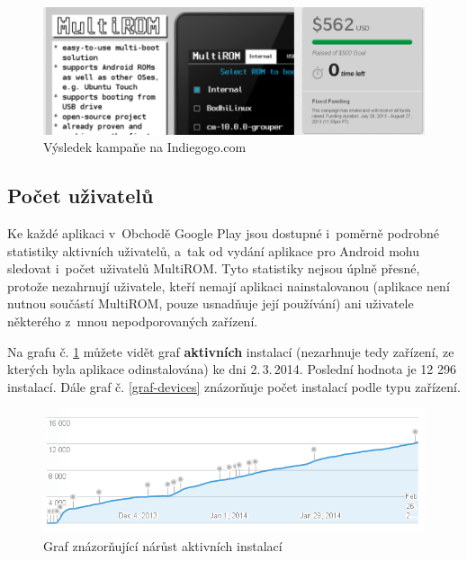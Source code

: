\documentclass[12pt, a4paper, oneside]{article}
\newcommand{\B}{\textbf} %
\begin{document}
\begin{figure}[H]
\begin{center}
 \includegraphics[width=\textwidth]{img/indiegogo.png}
\caption{Výsledek kampaňe na Indiegogo.com}
\end{center}
\end{figure}

\subsection{Počet uživatelů}
Ke každé aplikaci v~Obchodě Google Play jsou dostupné i~poměrně podrobné statistiky aktivních uživatelů, a~tak od vydání aplikace pro Android mohu sledovat i~počet uživatelů MultiROM. Tyto statistiky nejsou úplně přesné, protože nezahrnují uživatele, kteří nemají aplikaci nainstalovanou (aplikace není nutnou součástí MultiROM, pouze usnadňuje její používání) ani uživatele některého z~mnou nepodporovaných zařízení.

Na grafu č. \ref{graf-uzivatele} můžete vidět graf \B{aktivních} instalací (nezarhnuje tedy zařízení, ze kterých byla aplikace odinstalována) ke dni 2.\,3.\,2014. Poslední hodnota je 12 296 instalací. Dále graf č. \ref{graf-devices} znázorňuje počet instalací podle typu zařízení.

\begin{figure}[H]
\begin{center}
 \includegraphics[width=\textwidth]{img/graph_active.png}
\caption{Graf znázorňující nárůst aktivních instalací}
\label{graf-uzivatele}
\end{center}
\end{figure}
\end{document}
